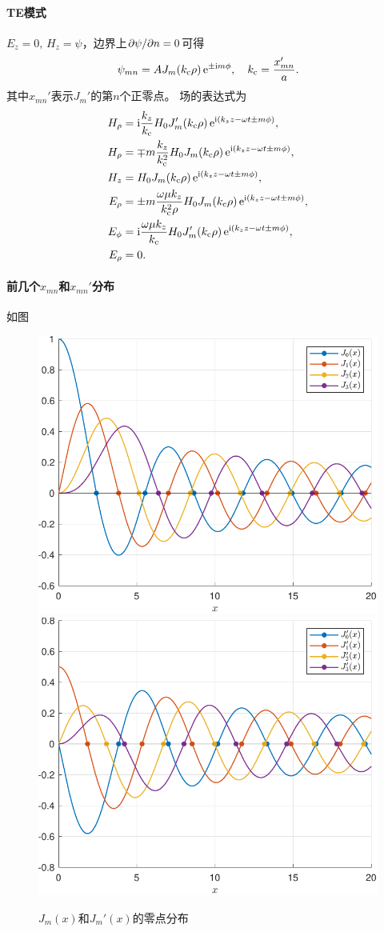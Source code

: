 \paragraph{TE模式}

$E_z=0,\,H_z=\psi$，边界上$\partial\psi/\partial n=0$可得
\begin{equation}
    \psi_{mn}=AJ_m(k_\text c\rho)\mathop{}\!\mathrm{e}^{\pm\mathrm{i} m\phi},\quad k_\text c=\frac{x_{mn}'}a.
\end{equation}
其中$x_{mn}'$表示$J_m'$的第$n$个正零点。
场的表达式为
\begin{subequations}
    \begin{align*}
        H_\rho&=\mathrm{i}\frac{k_z}{k_\text c}H_0J_m'(k_\text c\rho)\mathop{}\!\mathrm{e}^{\mathrm{i}(k_zz-\omega t\pm m\phi)},\\
        H_\rho&=\mp m\frac{k_z}{k_\text c^2}H_0J_m(k_\text c\rho)\mathop{}\!\mathrm{e}^{\mathrm{i}(k_zz-\omega t\pm m\phi)},\\
        H_z&=H_0J_m(k_\text c\rho)\mathop{}\!\mathrm{e}^{\mathrm{i}(k_zz-\omega t\pm m\phi)},\\
        E_\rho&=\pm m\frac{\omega\mu k_z}{k_\text c^2\rho}H_0J_m(k_\text c\rho)\mathop{}\!\mathrm{e}^{\mathrm{i}(k_zz-\omega t\pm m\phi)},\\
        E_\phi&=\mathrm{i}\frac{\omega\mu k_z}{k_\text c}H_0J_m'(k_\text c\rho)\mathop{}\!\mathrm{e}^{\mathrm{i}(k_zz-\omega t\pm m\phi)},\\
        E_\rho&=0.
    \end{align*}
\end{subequations}

\paragraph{前几个$x_{mn}$和$x_{mn}'$分布}
如图
\begin{figure}[!htp]
    \centering
        {\includegraphics[width=0.45\linewidth]{graphs/BesselJzero.pdf}}
        {\includegraphics[width=0.45\linewidth]{graphs/BesselJpzero.pdf}}
    \caption{$J_m(x)$和$J_m'(x)$的零点分布}
\end{figure}

